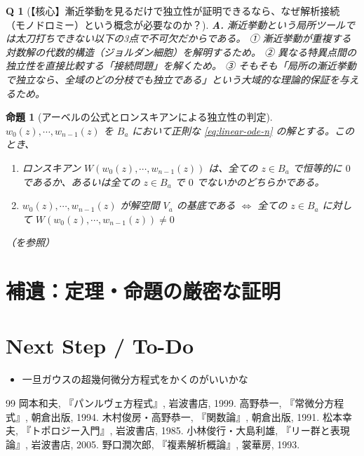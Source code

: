 \documentclass[paper=a4, fontsize=11pt]{jlreq} %
\theoremstyle{break}
\newtheorem{proposition}[theorem]{命題}
\theoremstyle{qa}
\newtheorem*{Q}{Q}
\theoremstyle{remark} %
\begin{document}
\begin{Q}[【核心】漸近挙動を見るだけで独立性が証明できるなら、なぜ解析接続（モノドロミー）という概念が必要なのか？]
\textbf{A.} 漸近挙動という局所ツールでは太刀打ちできない以下の3点で不可欠だからである。
① 漸近挙動が重複する対数解の代数的構造（ジョルダン細胞）を解明するため。
② 異なる特異点間の独立性を直接比較する「接続問題」を解くため。
③ そもそも「局所の漸近挙動で独立なら、全域のどの分枝でも独立である」という大域的な理論的保証を与えるため。
\end{Q}
\begin{proposition}[アーベルの公式とロンスキアンによる独立性の判定]\label{prop:wronskian_independence}
    $w_{0}(z),\cdots,w_{n-1}(z)$ を $B_{a}$ において正則な \eqref{eq:linear-ode-n} の解とする。このとき、
    \begin{enumerate}
        \item[(i)] ロンスキアン $W(w_{0}(z),\cdots,w_{n-1}(z))$ は、全ての $z\in B_{a}$ で恒等的に $0$ であるか、あるいは全ての $z\in B_{a}$ で $0$ でないかのどちらかである。
        \item[(ii)] $w_{0}(z),\cdots,w_{n-1}(z)$ が解空間 $V_{a}$ の基底である $\iff$ 全ての $z\in B_{a}$ に対して $W(w_{0}(z),\cdots,w_{n-1}(z)) \neq 0$
    \end{enumerate}
    （\cite[p.78 定理11.3]{book:takano}を参照）
\end{proposition}

\section{補遺：定理・命題の厳密な証明}


\section{Next Step / To-Do}
\begin{itemize}
    \item [-] 一旦ガウスの超幾何微分方程式をかくのがいいかな
\end{itemize}

\begin{thebibliography}{99}
     岡本和夫, 『パンルヴェ方程式』, 岩波書店, 1999.
     高野恭一, 『常微分方程式』, 朝倉出版, 1994.
     木村俊房・高野恭一, 『関数論』, 朝倉出版, 1991.
     松本幸夫, 『トポロジー入門』, 岩波書店, 1985.
     小林俊行・大島利雄, 『リー群と表現論』, 岩波書店, 2005.
     野口潤次郎, 『複素解析概論』, 裳華房, 1993.
\end{thebibliography}
\end{document}
